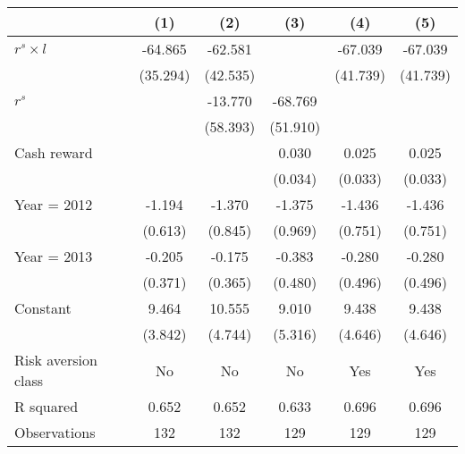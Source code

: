\begin{tabular}{l*{5}{c}}
\hline\hline
                    &\multicolumn{1}{c}{(1)}&\multicolumn{1}{c}{(2)}&\multicolumn{1}{c}{(3)}&\multicolumn{1}{c}{(4)}&\multicolumn{1}{c}{(5)}\\
\hline
$r^s \times l$      &     -64.865&     -62.581&            &     -67.039&     -67.039\\
                    &    (35.294)&    (42.535)&            &    (41.739)&    (41.739)\\
$r^s$               &            &     -13.770&     -68.769&            &            \\
                    &            &    (58.393)&    (51.910)&            &            \\
Cash reward         &            &            &       0.030&       0.025&       0.025\\
                    &            &            &     (0.034)&     (0.033)&     (0.033)\\
Year = 2012         &      -1.194&      -1.370&      -1.375&      -1.436&      -1.436\\
                    &     (0.613)&     (0.845)&     (0.969)&     (0.751)&     (0.751)\\
Year = 2013         &      -0.205&      -0.175&      -0.383&      -0.280&      -0.280\\
                    &     (0.371)&     (0.365)&     (0.480)&     (0.496)&     (0.496)\\
Constant            &       9.464&      10.555&       9.010&       9.438&       9.438\\
                    &     (3.842)&     (4.744)&     (5.316)&     (4.646)&     (4.646)\\
\hline
Risk aversion class &          No&          No&          No&         Yes&         Yes\\
R squared           &       0.652&       0.652&       0.633&       0.696&       0.696\\
Observations        &         132&         132&         129&         129&         129\\
\hline\hline
\end{tabular}
